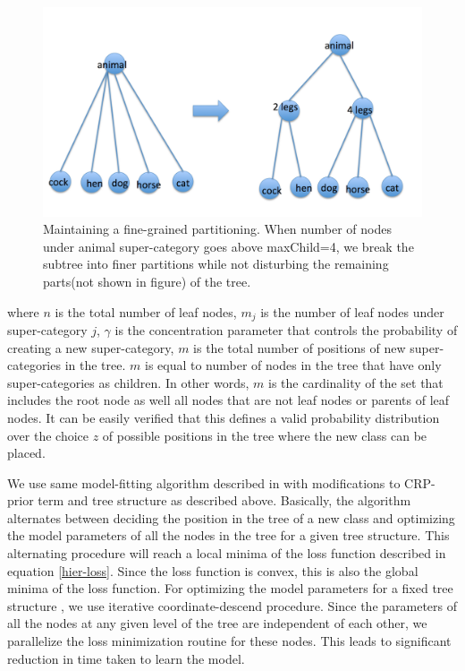 \documentclass[10pt,twocolumn,letterpaper]{article}
\begin{document}
  \begin{figure}[t]
  	\begin{center}
  		\includegraphics[width=0.8\linewidth]{split}
  	\end{center}
  	\caption{ Maintaining a fine-grained partitioning. When number of nodes under 
              animal super-category goes above maxChild=4, we break the subtree into 
              finer partitions while not disturbing the remaining parts(not shown in figure) 
              of the tree.  }
  	\label{fig:long}
  	\label{fig:onecol}
  \end{figure}
where $n$ is the total number of leaf nodes, $m_{j}$
is the number of leaf nodes under super-category $j$,
$\gamma$ is the concentration parameter that controls the probability of creating a new super-category,
$m$ is the total number of positions of new super-categories in the tree. $m$ is equal to number of nodes
in the tree that have only super-categories as children. In other words, $m$ is the cardinality of the set that 
includes the root node as well all nodes that are not leaf nodes or parents of leaf nodes. It can be easily verified that 
this defines a valid probability distribution over the choice $z$ of possible positions in the tree where the new class can be placed.

We use same model-fitting algorithm described in \cite{ruslan} with modifications to CRP-prior term and tree structure as described above.
Basically, the algorithm alternates between deciding the position in the tree of a new class and optimizing the model parameters of all the nodes
in the tree for a given tree structure.  This alternating procedure will reach a local minima of the loss function 
described in equation \ref{hier-loss}. Since the loss function is convex, this is also the global minima of the loss function. 
For optimizing the model parameters for a fixed tree structure , we use iterative coordinate-descend procedure.
Since the parameters of all the nodes at any given level of the tree are independent of each other, we parallelize the loss minimization 
routine for these nodes. This leads to significant reduction in time taken to learn the model.
\end{document}
